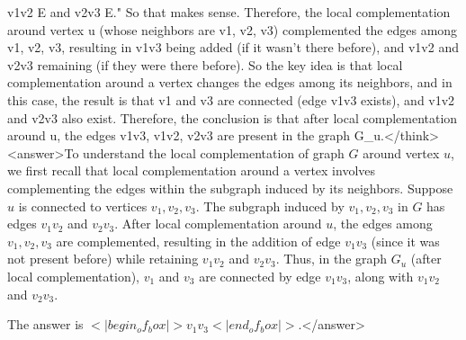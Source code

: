 v1v2 E and v2v3 E." So that makes sense. Therefore, the local complementation around vertex u (whose neighbors are v1, v2, v3) complemented the edges among v1, v2, v3, resulting in v1v3 being added (if it wasn't there before), and v1v2 and v2v3 remaining (if they were there before). So the key idea is that local complementation around a vertex changes the edges among its neighbors, and in this case, the result is that v1 and v3 are connected (edge v1v3 exists), and v1v2 and v2v3 also exist. Therefore, the conclusion is that after local complementation around u, the edges v1v3, v1v2, v2v3 are present in the graph G_u.</think><answer>To understand the local complementation of graph \( G \) around vertex \( u \), we first recall that local complementation around a vertex involves complementing the edges within the subgraph induced by its neighbors. Suppose \( u \) is connected to vertices \( v_1, v_2, v_3 \). The subgraph induced by \( v_1, v_2, v_3 \) in \( G \) has edges \( v_1v_2 \) and \( v_2v_3 \). After local complementation around \( u \), the edges among \( v_1, v_2, v_3 \) are complemented, resulting in the addition of edge \( v_1v_3 \) (since it was not present before) while retaining \( v_1v_2 \) and \( v_2v_3 \). Thus, in the graph \( G_u \) (after local complementation), \( v_1 \) and \( v_3 \) are connected by edge \( v_1v_3 \), along with \( v_1v_2 \) and \( v_2v_3 \).

The answer is \(<|begin_of_box|>v_1v_3<|end_of_box|>\).</answer>